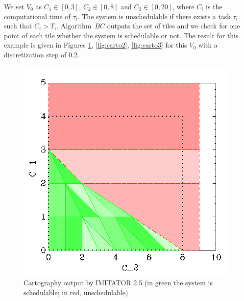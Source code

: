 \documentclass{article}
\begin{document}
We set $V_0$ as $C_1 \in [0,3]$, $C_2 \in [0,8]$ and $C_3 \in [0,20]$, where $C_i$ is the computational time of $\tau_i$. The system is unschedulable if there exists a task $\tau_i$ such that $C_i > T_i$. 
Algorithm~$BC$ outputs the set of tiles and we check for one point of each tile whether the system is schedulable or not.
The result for this example is given in Figures \ref{fig:carto1}, \ref{fig:carto2}, \ref{fig:carto3} for this $V_0$ with a discretization step of $0.2$.

\begin{figure}[!ht]
	\centering
 	\includegraphics[scale = 0.5]{./Figures/C1-C2.png}
	\caption{Cartography output by IMITATOR 2.5 (in green the system is schedulable; in red, unschedulable)}
	\label{fig:carto1}
\end{figure}
\end{document}

